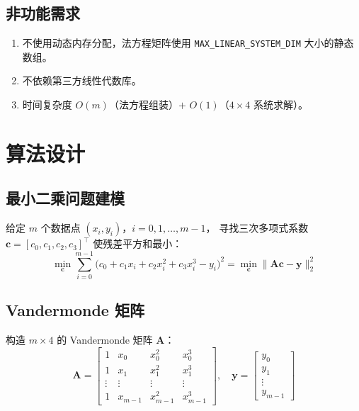 \documentclass[a4paper,10pt]{article}
\begin{document}
\subsection{非功能需求}

\begin{enumerate}[label=NFR-\arabic*]
  \item 不使用动态内存分配，法方程矩阵使用 \texttt{MAX\_LINEAR\_SYSTEM\_DIM} 大小的静态数组。
  \item 不依赖第三方线性代数库。
  \item 时间复杂度 $O(m)$（法方程组装）$+$ $O(1)$（$4 \times 4$ 系统求解）。
\end{enumerate}

\section{算法设计}

\subsection{最小二乘问题建模}

给定 $m$ 个数据点 $(x_i, y_i)$，$i = 0, 1, \ldots, m{-}1$，
寻找三次多项式系数 $\mathbf{c} = [c_0, c_1, c_2, c_3]^{\!\top}$ 使残差平方和最小：
\begin{equation}
  \min_{\mathbf{c}} \sum_{i=0}^{m-1} \bigl(c_0 + c_1 x_i + c_2 x_i^2 + c_3 x_i^3 - y_i\bigr)^2
  = \min_{\mathbf{c}} \|\mathbf{A}\mathbf{c} - \mathbf{y}\|_2^2
\end{equation}

\subsection{Vandermonde 矩阵}

构造 $m \times 4$ 的 Vandermonde 矩阵 $\mathbf{A}$：
\begin{equation}
  \mathbf{A} = \begin{bmatrix}
    1 & x_0 & x_0^2 & x_0^3 \\
    1 & x_1 & x_1^2 & x_1^3 \\
    \vdots & \vdots & \vdots & \vdots \\
    1 & x_{m-1} & x_{m-1}^2 & x_{m-1}^3
  \end{bmatrix}, \quad
  \mathbf{y} = \begin{bmatrix} y_0 \\ y_1 \\ \vdots \\ y_{m-1} \end{bmatrix}
\end{equation}
\end{document}
